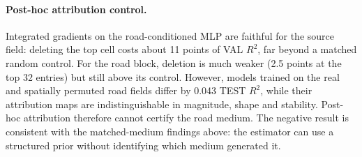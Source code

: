 \paragraph{Post-hoc attribution control.} Integrated gradients on the road-conditioned MLP are faithful for the source field: deleting the top cell costs about 11 points of VAL $R^2$, far beyond a matched random control. For the road block, deletion is much weaker (2.5 points at the top 32 entries) but still above its control. However, models trained on the real and spatially permuted road fields differ by 0.043 TEST $R^2$, while their attribution maps are indistinguishable in magnitude, shape and stability. Post-hoc attribution therefore cannot certify the road medium. The negative result is consistent with the matched-medium findings above: the estimator can use a structured prior without identifying which medium generated it.
